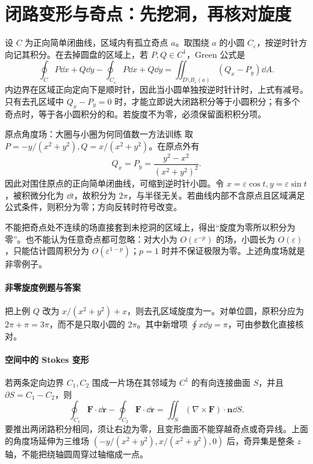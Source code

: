 \section{闭路变形与奇点：先挖洞，再核对旋度}\label{r2:green}
设 $C$ 为正向简单闭曲线，区域内有孤立奇点 $a$。取围绕 $a$ 的小圆 $C_\varepsilon$，按逆时针方向记其积分。在去掉圆盘的区域上，若 $P,Q\in C^1$，Green 公式是
\[
 \oint_C P\dd x+Q\dd y-\oint_{C_\varepsilon}P\dd x+Q\dd y
 =\iint_{D\setminus B_\varepsilon(a)}(Q_x-P_y)\dd A.
\]
内边界在区域正向定向下是顺时针，因此当小圆单独按逆时针计时，上式有减号。只有去孔区域中 $Q_x-P_y=0$ 时，才能立即说大闭路积分等于小圆积分；有多个奇点时，等于各小圆积分的和。若旋度不为零，必须保留面积积分项。

\begin{example}{原点角度场：大圈与小圈为何同值}{数一方法训练}
取 $P=-y/(x^2+y^2),Q=x/(x^2+y^2)$。在原点外有
\[
 Q_x=P_y=\frac{y^2-x^2}{(x^2+y^2)^2}.
\]
因此对围住原点的正向简单闭曲线，可缩到逆时针小圆。令 $x=\varepsilon\cos t,y=\varepsilon\sin t$，被积微分化为 $\dd t$，故积分为 $2\pi$，与半径无关。若曲线内部不含原点且区域满足公式条件，则积分为零；方向反转时符号改变。
\end{example}

\begin{warning}
不能把奇点处不连续的场直接套到未挖洞的区域上，得出“旋度为零所以积分为零”。也不能认为任意奇点都可忽略：对大小为 $O(\varepsilon^{-p})$ 的场，小圆长为 $O(\varepsilon)$，只能估计圆周积分为 $O(\varepsilon^{1-p})$；$p=1$ 时并不保证极限为零。上述角度场就是非零例子。
\end{warning}

\paragraph{非零旋度例题与答案}
把上例 $Q$ 改为 $x/(x^2+y^2)+x$，则去孔区域旋度为一。对单位圆，原积分应为 $2\pi+\pi=3\pi$，而不是只取小圆的 $2\pi$。其中新增项 $\oint x\dd y=\pi$，可由参数化直接核对。

\paragraph{空间中的 Stokes 变形}
若两条定向边界 $C_1,C_2$ 围成一片场在其邻域为 $C^1$ 的有向连接曲面 $S$，并且 $\partial S=C_1-C_2$，则
\[
 \oint_{C_1}\bm F\cdot\dd\bm r-\oint_{C_2}\bm F\cdot\dd\bm r
 =\iint_S(\nabla\times\bm F)\cdot\bm n\dd S.
\]
要推出两闭路积分相同，须让右边为零，且变形曲面不能穿越奇点或奇异线。上面的角度场延伸为三维场 $(-y/(x^2+y^2),x/(x^2+y^2),0)$ 后，奇异集是整条 $z$ 轴，不能把绕轴圆周穿过轴缩成一点。
